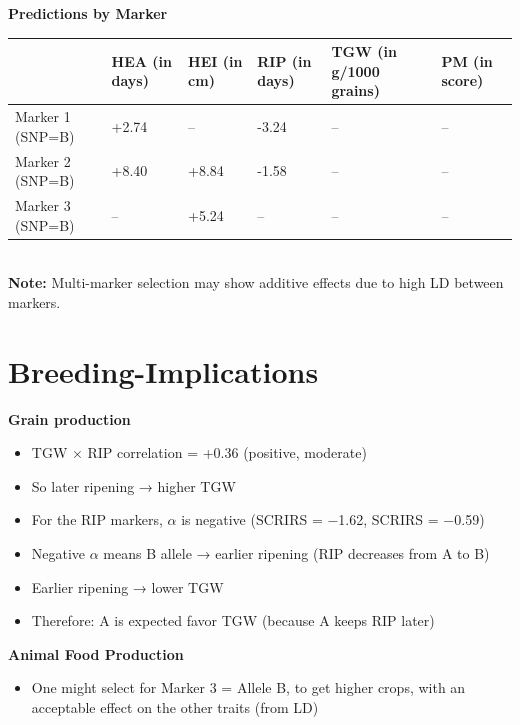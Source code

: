 \documentclass{article}
\begin{document}
		\bigskip
		\textbf{Predictions by Marker} \\
		
			\begin{tabular}{l|l|l|l|l|l}
					 				& HEA (in days)		& HEI (in cm) 		& RIP (in days)		& TGW (in g/1000 grains) 		& PM (in score) \\ \hline
				Marker 1 (SNP=B)	& +2.74 			&  --	 			& -3.24 			& --							& --			\\ \hline
				Marker 2 (SNP=B)	& +8.40 			&  +8.84 			& -1.58 			& --							& --			\\ \hline
				Marker 3 (SNP=B)	& -- 				&  +5.24 			& --	 			& --							& --			\\ \hline
			\end{tabular} \\


			\textbf{Note:} Multi-marker selection may show additive effects due to high LD between markers.
		
	\section{Breeding-Implications}
		
		\textbf{Grain production}
		\begin{itemize}
			\item TGW × RIP correlation = +0.36 (positive, moderate)
			\item So later ripening → higher TGW
			\item For the RIP markers, $\alpha$ is negative (SCRI\textunderscore RS = $-$1.62, SCRI\textunderscore RS = $-$0.59)
			\item Negative $\alpha$ means B allele → earlier ripening (RIP decreases from A to B)
			\item Earlier ripening → lower TGW
			\item Therefore: A is expected favor TGW (because A keeps RIP later)
		\end{itemize}
		
		\textbf{Animal Food Production}
		\begin{itemize}
			\item One might select for Marker 3 = Allele B, to get higher crops, with an acceptable effect on the other traits (from LD)
		\end{itemize}
			
	
\end{document}
